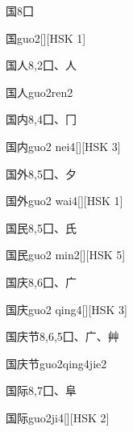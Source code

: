 \begin{entry}{国}{8}{⼞}
  \begin{phonetics}{国}{guo2}[][HSK 1]
  \end{phonetics}
\end{entry}

\begin{entry}{国人}{8,2}{⼞、⼈}
  \begin{phonetics}{国人}{guo2ren2}
  \end{phonetics}
\end{entry}

\begin{entry}{国内}{8,4}{⼞、⼌}
  \begin{phonetics}{国内}{guo2 nei4}[][HSK 3]
  \end{phonetics}
\end{entry}

\begin{entry}{国外}{8,5}{⼞、⼣}
  \begin{phonetics}{国外}{guo2 wai4}[][HSK 1]
  \end{phonetics}
\end{entry}

\begin{entry}{国民}{8,5}{⼞、⽒}
  \begin{phonetics}{国民}{guo2 min2}[][HSK 5]
  \end{phonetics}
\end{entry}

\begin{entry}{国庆}{8,6}{⼞、⼴}
  \begin{phonetics}{国庆}{guo2 qing4}[][HSK 3]
  \end{phonetics}
\end{entry}

\begin{entry}{国庆节}{8,6,5}{⼞、⼴、⾋}
  \begin{phonetics}{国庆节}{guo2qing4jie2}
  \end{phonetics}
\end{entry}

\begin{entry}{国际}{8,7}{⼞、⾩}
  \begin{phonetics}{国际}{guo2ji4}[][HSK 2]
  \end{phonetics}
\end{entry}

